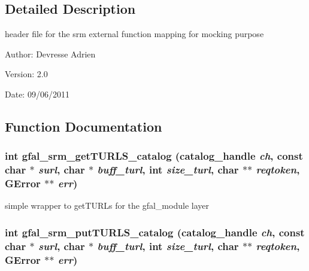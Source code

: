 \subsection{Detailed Description}
header file for the srm external function mapping for mocking purpose 

\begin{Desc}
\item[Author:]Devresse Adrien \end{Desc}
\begin{Desc}
\item[Version:]2.0 \end{Desc}
\begin{Desc}
\item[Date:]09/06/2011 \end{Desc}


\subsection{Function Documentation}
\subsubsection{\setlength{\rightskip}{0pt plus 5cm}int gfal\_\-srm\_\-get\-TURLS\_\-catalog (catalog\_\-handle {\em ch}, const char $\ast$ {\em surl}, char $\ast$ {\em buff\_\-turl}, int {\em size\_\-turl}, char $\ast$$\ast$ {\em reqtoken}, GError $\ast$$\ast$ {\em err})}\label{gfal__common__srm__internal__layer_8h_c51b90df2c43b149ad2f80afeb9200ed}


simple wrapper to get\-TURLs for the gfal\_\-module layer 
\subsubsection{\setlength{\rightskip}{0pt plus 5cm}int gfal\_\-srm\_\-put\-TURLS\_\-catalog (catalog\_\-handle {\em ch}, const char $\ast$ {\em surl}, char $\ast$ {\em buff\_\-turl}, int {\em size\_\-turl}, char $\ast$$\ast$ {\em reqtoken}, GError $\ast$$\ast$ {\em err})}\label{gfal__common__srm__internal__layer_8h_96bb61a1e4df92a074a6e173b8c02b4d}


